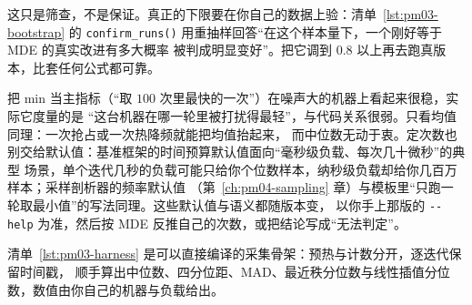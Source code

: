 \documentclass[12pt,a4paper,fontset=fandol]{ctexbook}
\newcommand{\Fn}[1]{\texttt{#1()}}
\newcommand{\Opt}[1]{\texttt{-\/-#1}}
\newcommand{\Bk}{\discretionary{}{}{}}
\newcommand{\Mx}[1]{\textsf{#1}}
\begin{document}
这只是筛查，不是保证。真正的下限要在你自己的数据上验：清单~\ref{lst:pm03-bootstrap} 的
\Fn{confirm\_{\Bk}runs} 用重抽样回答``在这个样本量下，一个刚好等于 \Mx{MDE} 的真实改进有多大概率
被判成明显变好''。把它调到 $0.8$ 以上再去跑真版本，比套任何公式都可靠。

\begin{warning}[title={``跑得快的那一次''不是基准}, label={box:pm03-mintrap}]
把 \Mx{min} 当主指标（``取 $100$ 次里最快的一次''）在噪声大的机器上看起来很稳，实际它度量的是
``这台机器在哪一轮里被打扰得最轻''，与代码关系很弱。只看均值同理：一次抢占或一次热降频就能把均值抬起来，
而中位数无动于衷。定次数也别交给默认值：基准框架的时间预算默认值面向``毫秒级负载、每次几十微秒''的典型
场景，单个迭代几秒的负载可能只给你个位数样本，纳秒级负载却给你几百万样本；采样剖析器的频率默认值
（第~\ref{ch:pm04-sampling} 章）与模板里``只跑一轮取最小值''的写法同理。这些默认值与语义都随版本变，
以你手上那版的 \Opt{help} 为准，然后按 \Mx{MDE} 反推自己的次数，或把结论写成``无法判定''。
\end{warning}

清单~\ref{lst:pm03-harness} 是可以直接编译的采集骨架：预热与计数分开，逐迭代保留时间戳，
顺手算出中位数、四分位距、\Mx{MAD}、最近秩分位数与线性插值分位数，数值由你自己的机器与负载给出。
\end{document}
